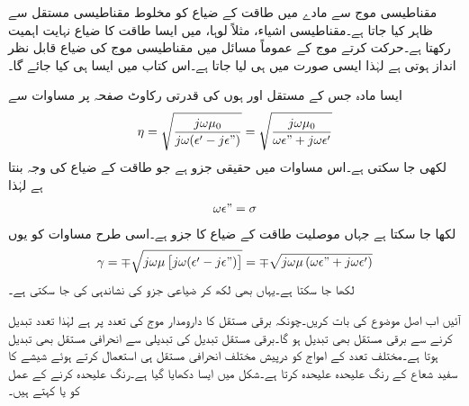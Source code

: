 مقناطیسی موج سے مادے میں طاقت کے ضیاع کو مخلوط مقناطیسی مستقل  سے ظاہر کیا جاتا ہے۔مقناطیسی اشیاء، مثلاً لوہا، میں ایسا طاقت کا ضیاع نہایت اہمیت رکھتا ہے۔حرکت کرتے موج کے عموماً مسائل میں مقناطیسی موج کی ضیاع قابل نظر انداز ہوتی ہے لہٰذا ایسی صورت میں  ہی لیا جاتا ہے۔اس کتاب میں ایسا ہی کیا جائے گا۔

ایسا مادہ جس کے مستقل  اور  ہوں کی قدرتی رکاوٹ صفحہ  پر مساوات  سے
\begin{align}
\eta=\sqrt{\frac{j \omega \mu_0}{j \omega (\epsilon'-j\epsilon")}}=\sqrt{\frac{j\omega \mu_0}{\omega \epsilon"+j\omega \epsilon'}}
\end{align}
لکھی جا سکتی ہے۔اس مساوات میں حقیقی جزو  ہے جو طاقت کے ضیاع کی وجہ بنتا ہے لہٰذا 
\begin{align}
\omega \epsilon"=\sigma
\end{align}
لکھا جا سکتا ہے جہاں موصلیت طاقت کے ضیاع کا جزو ہے۔اسی طرح مساوات  کو یوں
\begin{align}
\gamma=\mp \sqrt{j \omega \mu  \left[j \omega (\epsilon'-j\epsilon" )\right]}=\mp \sqrt{j \omega \mu  \left(\omega \epsilon"+j\omega\epsilon' \right)}
\end{align}
لکھا جا سکتا ہے۔یہاں بھی  لکھ کر ضیاعی جزو کی نشاندہی کی جا سکتی ہے۔

آئیں اب اصل موضوع کی بات کریں۔چونکہ برقی مستقل کا دارومدار موج کی تعدد پر ہے لہٰذا تعدد تبدیل  کرنے سے برقی مستقل بھی تبدیل ہو گا۔برقی مستقل تبدیل کی تبدیلی سے انحرافی مستقل بھی تبدیل ہوتا ہے۔مختلف تعدد کے امواج کو درپیش مختلف انحرافی مستقل ہی استعمال کرتے ہوئے شیشے کا   سفید شعاع کے رنگ علیحدہ علیحدہ کرتا ہے۔شکل  میں ایسا دکھایا گیا ہے۔رنگ علیحدہ کرنے کے عمل کو  یا  کہتے ہیں۔

